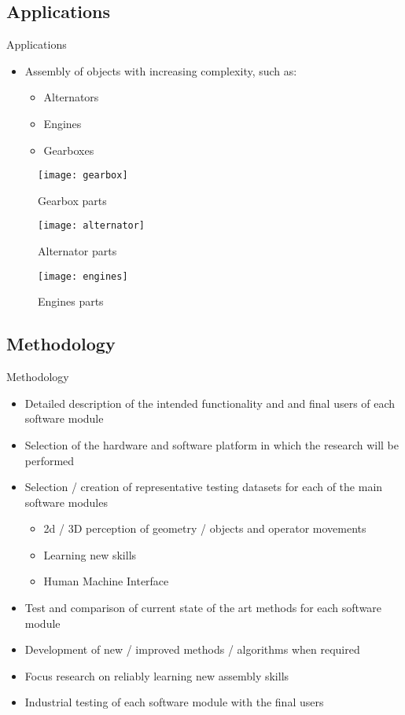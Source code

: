 \subsection{Applications}
\begin{frame}{Applications}
	\begin{itemize}
		\item Assembly of objects with increasing complexity, such as:
		\begin{itemize}
			\item Alternators
			\item Engines
			\item Gearboxes
		\end{itemize}
	\end{itemize}
	\begin{figure}[!ht]
		\centering
		\begin{minipage}{0.32\textwidth}
			\centering
			\texttt{[image: gearbox]}
			\caption{Gearbox parts}
		\end{minipage}%
		\begin{minipage}{.32\textwidth}
			\centering
			\texttt{[image: alternator]}
			\caption{Alternator parts}
		\end{minipage}%
		\begin{minipage}{0.32\textwidth}
			\centering
			\texttt{[image: engines]}
			\caption{Engines parts}
		\end{minipage}
	\end{figure}
\end{frame}

\subsection{Methodology}
\begin{frame}{Methodology}
	\begin{itemize}
		\item Detailed description of the intended functionality and and final users of each software module
		\item Selection of the hardware and software platform in which the research will be performed
		\item Selection / creation of representative testing datasets for each of the main software modules
		\begin{itemize}
			\item 2d / 3D perception of geometry / objects and operator movements
			\item Learning new skills
			\item Human Machine Interface
		\end{itemize}
		\item Test and comparison of current state of the art methods for each software module
		\item Development of new / improved methods / algorithms when required
		\item Focus research on reliably learning new assembly skills
		\item Industrial testing of each software module with the final users
	\end{itemize}
\end{frame}
